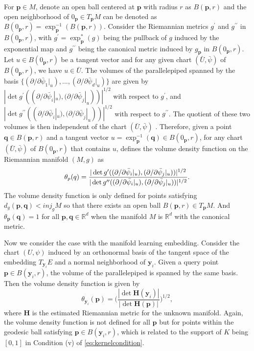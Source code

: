 \documentclass[11pt,a4paper,]{article}
\begin{document}
For \(\pmb{p} \in M\), denote an open ball centered at \(\pmb{p}\) with radius \(r\) as \(B(\pmb{p},r)\) and the open neighborhood of \(0_{\pmb{p}} \in T_{\pmb{p}}M\) can be denoted as \(B(0_{\pmb{p}},r)=\exp_{\pmb{p}}^{-1}(B(\pmb{p},r))\). Consider the Riemannian metrics \(g^{\prime}\) and \(g^{\prime \prime}\) in \(B(0_{\pmb{p}},r)\), with \(g^{\prime} = \exp^{\ast}_{\pmb{p}}(g)\) being the pullback of \(g\) induced by the exponential map and \(g^{\prime \prime}\) being the canonical metric induced by \(g_{\pmb{p}}\) in \(B(0_{\pmb{p}},r)\).
Let \(u \in B(0_{\pmb{p}},r)\) be a tangent vector and for any given chart \((\bar{U}, \bar{\psi})\) of \(B(0_{\pmb{p}},r)\), we have \(u \in \bar{U}\).
The volumes of the parallelepiped spanned by the basis \(\{(\partial / \partial\bar{\psi}_1|_u), \dots, (\partial / \partial\bar{\psi}_d|_u)\}\) are given by \(| \det g^{\prime}((\partial / \partial\bar{\psi}_i|_u), (\partial / \partial\bar{\psi}_j|_u)) |^{1/2}\) with respect to \(g^{\prime}\), and \(| \det g^{\prime \prime}((\partial / \partial\bar{\psi}_i|_u), (\partial / \partial\bar{\psi}_j|_u)) |^{1/2}\) with respect to \(g^{\prime \prime}\). The quotient of these two volumes is then independent of the chart \((\bar{U}, \bar{\psi})\) \autocite{Henry2009-om}.
Therefore, given a point \(\pmb{q} \in B(\pmb{p},r)\) and a tangent vector \(u = \exp^{-1}_{\pmb{p}}(\pmb{q}) \in B(0_{\pmb{p}},r)\), for any chart \((\bar{U}, \bar{\psi})\) of \(B(0_{\pmb{p}},r)\) that contains \(u\), \textcite{Henry2009-om} defines the volume density function on the Riemannian manifold \((M,g)\) as
\begin{equation}
\label{eq:volumedensityratio}
\theta_p(q) = \frac{| \det g^{\prime}((\partial / \partial\bar{\psi}_i|_u), (\partial / \partial\bar{\psi}_j|_u)) |^{1/2} }{ | \det g^{\prime \prime}((\partial / \partial\bar{\psi}_i|_u), (\partial / \partial\bar{\psi}_j|_u)) |^{1/2} } \\ .
\end{equation}
The volume density function is only defined for points satisfying \(d_g(\pmb{p},\pmb{q}) < inj_gM\) so that there exists an open ball \(B(\pmb{p},r) \in T_{\pmb{p}}M\). And \(\theta_{\pmb{p}}(\pmb{q})=1\) for all \(\pmb{p},\pmb{q} \in \mathbb{R}^d\) when the manifold \(M\) is \(\mathbb{R}^d\) with the canonical metric.

Now we consider the case with the manifold learning embedding. Consider the chart \((U, \psi)\) induced by an orthonormal basis of the tangent space of the embedding \(T_{\pmb{y}_i}E\) and a normal neighborhood of \(\pmb{y}_i\). Given a query point \(\pmb{p} \in B(\pmb{y}_i,r)\), the volume of the parallelepiped is spanned by the same basis.
Then the volume density function is given by
\begin{equation}
\label{eq:volumedensityest}
\theta_{\pmb{y}_i}(\pmb{p}) = \bigg(\frac{|\det \pmb{H}(\pmb{y}_i)|}{|\det \pmb{H}(\pmb{p})|} \bigg)^{1/2},
\end{equation}
where \(\pmb{H}\) is the estimated Riemannian metric for the unknown manifold.
Again, the volume density function is not defined for all \(\pmb{p}\) but for points within the geodesic ball satisfying \(\pmb{p} \in B(\pmb{y}_i,r)\), which is related to the support of \(K\) being \([0,1]\) in Condition (v) of \eqref{eq:kernelcondition}.
\end{document}
